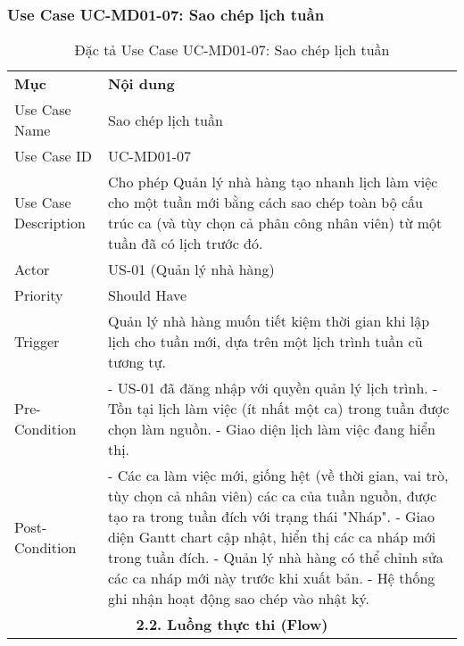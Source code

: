 \subsubsection{Use Case UC-MD01-07: Sao chép lịch tuần}
\begin{longtable}{|m{4cm}|p{11cm}|}
\caption{Đặc tả Use Case UC-MD01-07: Sao chép lịch tuần} \label{tab:uc_md01_07} \\
\hline

\endhead %

\hline
\endfoot %

\hline
\endlastfoot %
\multicolumn{2}{|c|}{\textbf{2.1. Tóm tắt (Summary)}} \\
\hline
\textbf{Mục} & \textbf{Nội dung} \\
\hline
Use Case Name & Sao chép lịch tuần \\
\hline
Use Case ID & UC-MD01-07 \\
\hline
Use Case Description & Cho phép Quản lý nhà hàng tạo nhanh lịch làm việc cho một tuần mới bằng cách sao chép toàn bộ cấu trúc ca (và tùy chọn cả phân công nhân viên) từ một tuần đã có lịch trước đó. \\
\hline
Actor & US-01 (Quản lý nhà hàng) \\
\hline
Priority & Should Have \\
\hline
Trigger & Quản lý nhà hàng muốn tiết kiệm thời gian khi lập lịch cho tuần mới, dựa trên một lịch trình tuần cũ tương tự. \\
\hline
Pre-Condition & - US-01 đã đăng nhập với quyền quản lý lịch trình. \newline - Tồn tại lịch làm việc (ít nhất một ca) trong tuần được chọn làm nguồn. \newline - Giao diện lịch làm việc đang hiển thị. \\
\hline
Post-Condition & - Các ca làm việc mới, giống hệt (về thời gian, vai trò, tùy chọn cả nhân viên) các ca của tuần nguồn, được tạo ra trong tuần đích với trạng thái "Nháp". \newline - Giao diện Gantt chart cập nhật, hiển thị các ca nháp mới trong tuần đích. \newline - Quản lý nhà hàng có thể chỉnh sửa các ca nháp mới này trước khi xuất bản. \newline - Hệ thống ghi nhận hoạt động sao chép vào nhật ký. \\
\hline
\multicolumn{2}{|c|}{\textbf{2.2. Luồng thực thi (Flow)}} \\
\hline

\end{longtable}
